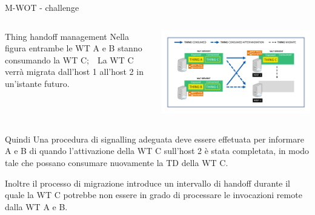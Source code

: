 \documentclass{beamer}
\begin{document}
\begin{frame}{M-WOT - challenge}
	\begin{columns}
		\begin{column}[c]{0.5\textwidth}
			\begin{block}{Thing handoff management}
				Nella figura entrambe le WT A e B stanno consumando la WT C;\ \
				La WT C verrà migrata dall'host 1 all'host 2 in un'istante futuro. \\

			\end{block}
		\end{column}
		\begin{column}[c]{0.5\textwidth}
			\centering
			\includegraphics[width=\textwidth]{./images/4.png}
		\end{column}
	\end{columns}
	\begin{block}{Quindi}
		Una procedura di signalling adeguata deve essere effetuata per informare A e B di quando l'attivazione della WT C sull'host 2 è stata completata, in modo tale che possano consumare nuovamente la TD della WT C. \\
	\end{block}
	\begin{alertblock}{Inoltre}
		il processo di migrazione introduce un intervallo di handoff durante il quale la WT C potrebbe non essere in grado di processare le invocazioni remote dalla WT A e B.
	\end{alertblock}
\end{frame}
\end{document}
